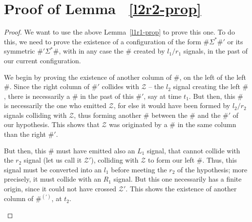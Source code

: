 \documentclass{jac}
\theoremstyle{definition}
\begin{document}
\section{Proof of Lemma  ~\ref{l2r2-prop}}

  \begin{proof}
    We want to use the above Lemma~\ref{l1r1-prop} to prove this one. To do this, we
    need to prove the existence of a configuration of the form $\#\Sigma^*\#'$
    or its symmetric $\#'\Sigma^*\#$, with in any case the $\#$ created by $l_1/r_1$
    signals, in the past of our current configuration.


    We begin by proving the existence of another column of $\#$, on the left
    of the left $\#$. Since the right column of $\#'$ collides with $\mathcal Z$ --
    the $l_2$ signal creating the left $\#$, there is necessarily a $\#$ in the past
    of this $\#'$, say at time $t_1$. But then, this $\#$ is necessarily the one who
    emitted $\mathcal Z$, for else it would have been formed by $l_2/r_2$ signals colliding
    with $\mathcal Z$, thus forming another $\#$ between the $\#$ and the $\#'$ of our
    hypothesis. This shows that $\mathcal Z$ was originated by
    a $\#$ in the same column than the right $\#'$.

    But then, this $\#$ must have emitted also an $L_1$ signal, that cannot collide
    with the $r_2$ signal (let us call it ${\mathcal Z}'$),
    colliding with $\mathcal Z$ to form our left $\#$. Thus, this
    signal must be converted into an $l_1$ before meeting the $r_2$ of the hypothesis;
    more precisely, it must collide with an $R_1$ signal. But this one necessarily has
    a finite origin, since it could not have crossed ${\mathcal Z}'$. This shows the
    existence of another column of $\#^{(')}$, at $t_2$.

    \begin{center}
\end{center}
\end{proof}
\end{document}
